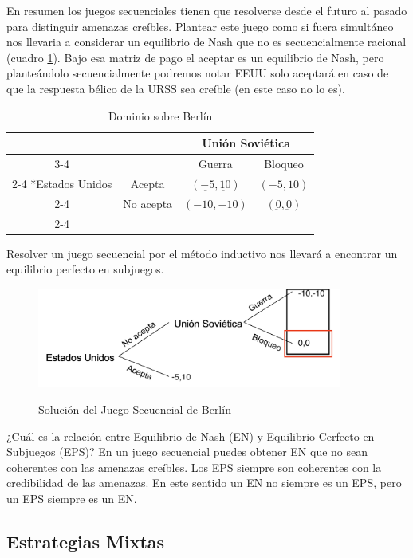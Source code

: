 En resumen los juegos secuenciales tienen que resolverse desde el futuro al pasado para distinguir amenazas creíbles. Plantear este juego como si fuera simultáneo nos llevaria a considerar un equilibrio de Nash que no es secuencialmente racional (cuadro \ref{simult Berlín}). Bajo esa matriz de pago el aceptar es un equilibrio de Nash, pero planteándolo secuencialmente podremos notar EEUU solo aceptará en caso de que la respuesta bélico de la URSS sea creíble (en este caso no lo es).

\begin{table}[!htbp]
    \centering
    \caption{Dominio sobre Berlín}
    \setlength{\extrarowheight}{2pt}
    \begin{tabular}{*{4}{c|}}
      \multicolumn{2}{c}{} & \multicolumn{2}{c}{Unión Soviética}\\\cline{3-4}
      \multicolumn{1}{c}{} &  & Guerra & Bloqueo \\\cline{2-4}
      \multirow{2}*{Estados Unidos}  & Acepta & $(\underbar{-5},\underbar{10})$ & $(-5,10)$ \\\cline{2-4}
      & No acepta & $(-10,-10)$ & $(\underbar{0},\underbar{0})$ \\\cline{2-4}
    \end{tabular} \label{simult Berlín}
  \end{table}

Resolver un juego secuencial por el método inductivo nos llevará a encontrar un equilibrio perfecto en subjuegos. 

\begin{figure}[htb]
  \centering
  \caption{Solución del Juego Secuencial de Berlín}
  \includegraphics[width=10cm]{Figuras/Inducción.png}
  \label{Solución Soviética}
\end{figure}

¿Cuál es la relación entre Equilibrio de Nash (EN) y Equilibrio Cerfecto en Subjuegos (EPS)? En un juego secuencial puedes obtener EN que no sean coherentes con las amenazas creíbles. Los EPS siempre son coherentes con la credibilidad de las amenazas. En este sentido un EN no siempre es un EPS, pero un EPS siempre es un EN.

\subsection{Estrategias Mixtas}

